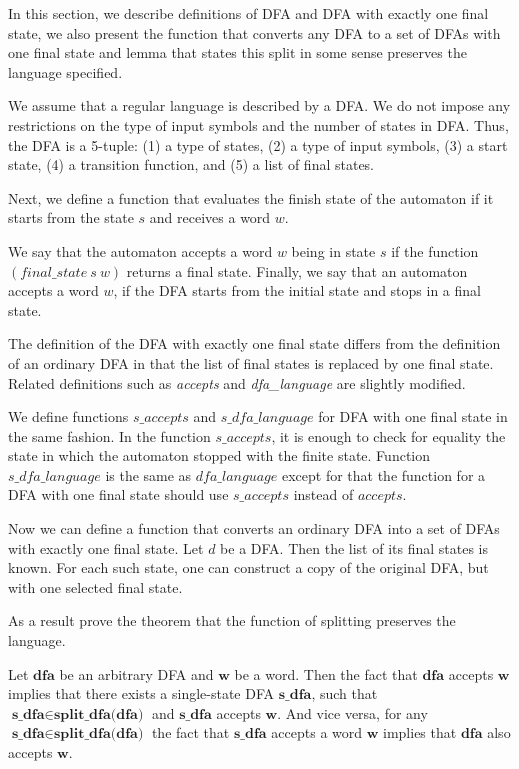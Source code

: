 \documentclass[runningheads]{llncs}
\begin{document}
In this section, we describe definitions of DFA and DFA with exactly one final state, we also present the function that converts any DFA to a set of DFAs with one final state and lemma that states this split in some sense preserves the language specified.

We assume that a regular language is described by a DFA. We do not impose any restrictions on the type of input symbols and the number of states in DFA. Thus, the DFA is a 5-tuple: (1) a type of states, (2) a type of input symbols, (3) a start state, (4) a transition function, and (5) a list of final states.

Next, we define a function that evaluates the finish state of the automaton if it starts from the state $s$ and receives a word $w$.

We say that the automaton accepts a word $w$ being in state $s$ if the function $(\textit{final\_state} \ s \ w)$ returns a final state.
Finally, we say that an automaton accepts a word $w$, if the DFA starts from the initial state and stops in a final state.


The definition of the  DFA with exactly one final state differs from the definition of an ordinary DFA in that the list of final states is replaced by one final state.
Related definitions such as \textit{accepts} and \textit{dfa\_language} are slightly modified.

We define functions $\textit{s\_accepts}$ and $\textit{s\_dfa\_language}$ for DFA with one final state in the same fashion.
In the function $\textit{s\_accepts}$, it is enough to check for equality the state in which the automaton stopped with the finite state. Function $\textit{s\_dfa\_language}$ is the same as  $\textit{dfa\_language}$ except for that the function for a DFA with one final state should use $\textit{s\_accepts}$ instead of $\textit{accepts}$.

Now we can define a function that converts an ordinary DFA into a set of DFAs with exactly one final state.
Let $d$ be a DFA. Then the list of its final states is known.
For each such state, one can construct a copy of the original DFA, but with one selected final state.

As a result prove the theorem that the function of splitting preserves the language.

\begin{theorem}
  Let $\textbf{dfa}$ be an arbitrary DFA and $\textbf{w}$ be a word. Then the fact that $\textbf{dfa}$ accepts $\textbf{w}$ implies that there exists a single-state DFA $\textbf{s\_dfa}$, such that $\textbf{s\_dfa} \in \textbf{split\_dfa(dfa)}$ and $\textbf{s\_dfa}$ accepts $\textbf{w}$. And vice versa, for any $\textbf{s\_dfa} \in \textbf{split\_dfa(dfa)}$ the fact that $\textbf{s\_dfa}$ accepts a word $\textbf{w}$ implies that $\textbf{dfa}$ also accepts $\textbf{w}$.
\end{theorem}
\end{document}
